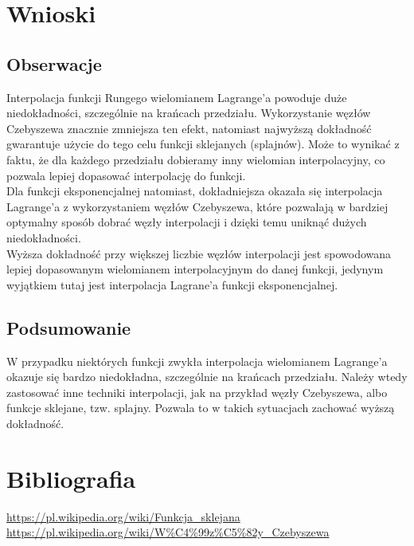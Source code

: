\documentclass[11pt]{scrartcl}
\begin{document}
    \section{Wnioski}
    \subsection{Obserwacje}
    Interpolacja funkcji Rungego wielomianem Lagrange'a powoduje
    duże niedokładności, szczególnie na krańcach przedziału.
    Wykorzystanie węzłów Czebyszewa znacznie zmniejsza ten efekt,
    natomiast najwyższą dokładność gwarantuje użycie do tego celu
    funkcji sklejanych (splajnów). Może to wynikać z faktu, że
    dla każdego przedziału dobieramy inny wielomian interpolacyjny,
    co pozwala lepiej dopasować interpolację do funkcji. \\
    Dla funkcji eksponencjalnej natomiast, dokładniejsza okazała
    się interpolacja Lagrange'a z wykorzystaniem węzłów Czebyszewa,
    które pozwalają w bardziej optymalny sposób dobrać węzły
    interpolacji i dzięki temu uniknąć dużych niedokładności. \\
    Wyższa dokładność przy większej liczbie węzłów interpolacji
    jest spowodowana lepiej dopasowanym wielomianem interpolacyjnym
    do danej funkcji, jedynym wyjątkiem tutaj jest interpolacja
    Lagrane'a funkcji eksponencjalnej.

    \subsection{Podsumowanie}
    W przypadku niektórych funkcji zwykła interpolacja wielomianem
    Lagrange'a okazuje się bardzo niedokładna, szczególnie na
    krańcach przedziału. Należy wtedy zastosować inne techniki
    interpolacji, jak na przykład węzły Czebyszewa, albo funkcje
    sklejane, tzw. splajny. Pozwala to w takich sytuacjach zachować
    wyższą dokładność.

    \section{Bibliografia}
    \url{https://pl.wikipedia.org/wiki/Funkcja_sklejana} \\
    \url{https://pl.wikipedia.org/wiki/W%C4%99z%C5%82y_Czebyszewa}
\end{document}
